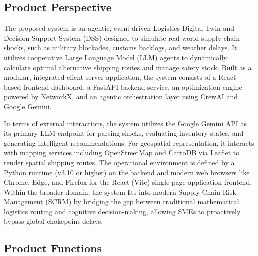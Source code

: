 \subsection{Product Perspective}

The proposed system is an agentic, event-driven Logistics Digital Twin and Decision Support System (DSS) designed to simulate real-world supply chain shocks, such as military blockades, customs backlogs, and weather delays. It utilizes cooperative Large Language Model (LLM) agents to dynamically calculate optimal alternative shipping routes and manage safety stock. Built as a modular, integrated client-server application, the system consists of a React-based frontend dashboard, a FastAPI backend service, an optimization engine powered by NetworkX, and an agentic orchestration layer using CrewAI and Google Gemini.

In terms of external interactions, the system utilizes the Google Gemini API as its primary LLM endpoint for parsing shocks, evaluating inventory states, and generating intelligent recommendations. For geospatial representation, it interacts with mapping services including OpenStreetMap and CartoDB via Leaflet to render spatial shipping routes. The operational environment is defined by a Python runtime (v3.10 or higher) on the backend and modern web browsers like Chrome, Edge, and Firefox for the React (Vite) single-page application frontend. Within the broader domain, the system fits into modern Supply Chain Risk Management (SCRM) by bridging the gap between traditional mathematical logistics routing and cognitive decision-making, allowing SMEs to proactively bypass global chokepoint delays.

\subsection{Product Functions}

